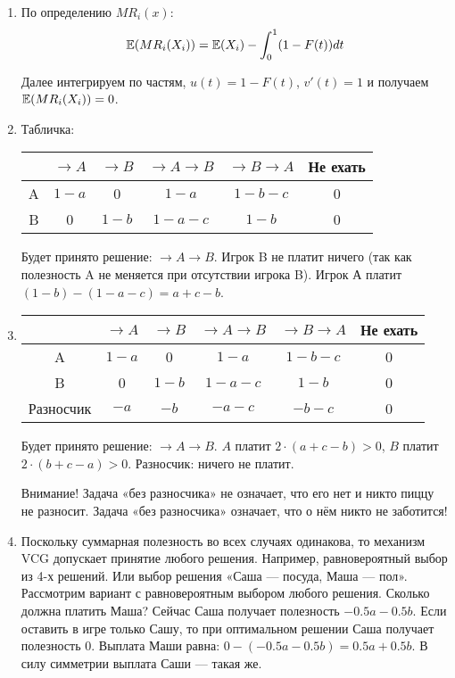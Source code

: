 \begin{enumerate}
\item По определению $ MR_{i}(x) $:
\begin{equation}
\operatorname{\mathbb{E}}(MR_{i}(X_{i}))=\operatorname{\mathbb{E}}(X_{i})-\int_{0}^{1}(1-F(t))dt
\end{equation}

Далее интегрируем по частям, $ u(t)=1-F(t) $, $ v'(t)=1 $ и получаем $ \operatorname{\mathbb{E}}(MR_{i}(X_{i}))=0 $.

\item Табличка:

\begin{tabular}{c|ccccc}
& $ \to A $ & $ \to B $ & $ \to A\to B $ & $ \to B \to A $ & Не ехать \\
\hline
A & $ 1-a $ & 0 & $ 1-a $ & $ 1-b-c $ & 0 \\
B & 0 & $ 1-b $ & $ 1-a-c $ & $ 1-b $ & 0 \\
\end{tabular}

Будет принято решение: $ \to A\to B $. Игрок B не платит ничего (так как полезность A не меняется при отсутствии игрока B). Игрок А платит $ (1-b)-(1-a-c)=a+c-b $.

\item \begin{tabular}{c|ccccc}
& $ \to A $ & $ \to B $ & $ \to A\to B $ & $ \to B \to A $ & Не ехать \\
\hline
A & $ 1-a $ & 0 & $ 1-a $ & $ 1-b-c $ & 0 \\
B & 0 & $ 1-b $ & $ 1-a-c $ & $ 1-b $ & 0 \\
Разносчик & $ -a $ & $ -b $ & $ -a-c $ & $ -b-c $ & 0 \\
\end{tabular}

Будет принято решение: $ \to A\to B $. $ A $ платит $ 2\cdot (a+c-b)>0 $, $ B $ платит $ 2\cdot (b+c-a)>0 $. Разносчик: ничего не платит.

Внимание! Задача «без разносчика» не означает, что его нет и никто пиццу не разносит. Задача «без разносчика» означает, что о нём никто не заботится!

\item Поскольку суммарная полезность во всех случаях одинакова, то механизм VCG допускает принятие любого решения. Например, равновероятный выбор из 4-х решений. Или выбор решения «Саша — посуда, Маша — пол». Рассмотрим вариант с равновероятным выбором любого решения. Сколько должна платить Маша? Сейчас Саша получает полезность $-0.5a-0.5b $. Если оставить в игре только Сашу, то при оптимальном решении Саша получает полезность $ 0 $. Выплата Маши равна: $0-(-0.5a-0.5b)=0.5a+0.5b$. В силу симметрии выплата Саши — такая же.


\end{enumerate}
